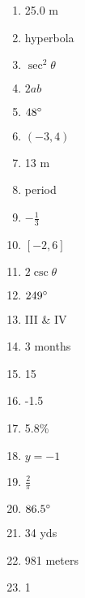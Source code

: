 \documentclass[../uilmath.tex]{subfiles}
\begin{document}
\begin{enumerate}[label=\bfseries\arabic*.]
    \item %
    25.0 m 

    \item %
    hyperbola 

    \item %
    $\sec^2 \theta$

    \item %
    $2ab$

    \item %
    $48\degree$

    \item %
    $(-3,4)$

    \item %
    13 m 

    \item %
    period 

    \item %
    $-\frac{1}{3}$

    \item %
    $[-2,6]$

    \item %
    $2\csc\theta$

    \item %
    $249\degree$

    \item %
    III \& IV

    \item %
    3 months 

    \item %
    15

    \item %
    -1.5

    \item %
    5.8\%

    \item %
    $y=-1$

    \item %
    $\frac{2}{\pi}$

    \item %
    $86.5\degree$

    \item %
    34 yds 

    \item %
    981 meters 

    \item %
    1


\end{enumerate}
\end{document}
